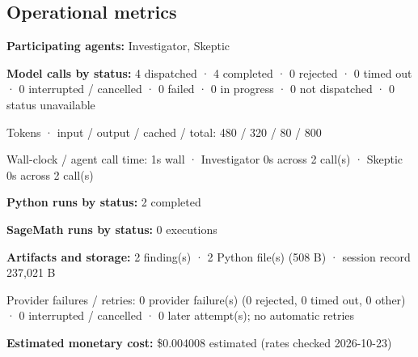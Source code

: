 \documentclass[11pt]{article}
\begin{document}
\subsection{Operational metrics}
\textbf{Participating agents:} Investigator, Skeptic\par
\textbf{Model calls by status:} 4 dispatched · 4 completed · 0 rejected · 0 timed out · 0 interrupted / cancelled · 0 failed · 0 in progress · 0 not dispatched · 0 status unavailable\par
Tokens · input / output / cached / total: 480 / 320 / 80 / 800\par
Wall-clock / agent call time: 1s wall · Investigator 0s across 2 call(s) · Skeptic 0s across 2 call(s)\par
\textbf{Python runs by status:} 2 completed\par
\textbf{SageMath runs by status:} 0 executions\par
\textbf{Artifacts and storage:} 2 finding(s) · 2 Python file(s) (508 B) · session record 237,021 B\par
Provider failures / retries: 0 provider failure(s) (0 rejected, 0 timed out, 0 other) · 0 interrupted / cancelled · 0 later attempt(s); no automatic retries\par
\textbf{Estimated monetary cost:} \$0.004008 estimated (rates checked 2026-10-23)\par
\end{document}

